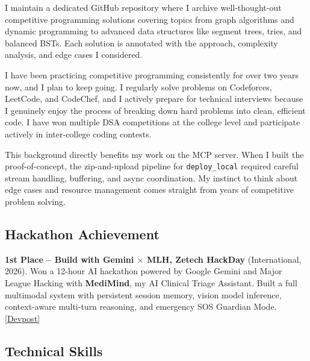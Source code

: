 \documentclass[12pt, a4paper]{article}
\begin{document}
I maintain a dedicated GitHub repository where I archive well-thought-out
competitive programming solutions covering topics from graph algorithms
and dynamic programming to advanced data structures like segment trees,
tries, and balanced BSTs. Each solution is annotated with the approach,
complexity analysis, and edge cases I considered.

I have been practicing competitive programming consistently for over two
years now, and I plan to keep going. I regularly solve problems on
Codeforces, LeetCode, and CodeChef, and I actively prepare for technical
interviews because I genuinely enjoy the process of breaking down hard
problems into clean, efficient code. I have won multiple DSA competitions
at the college level and participate actively in inter-college coding
contests.

This background directly benefits my work on the MCP server. When I
built the proof-of-concept, the zip-and-upload pipeline for
\texttt{deploy\_local} required careful stream handling, buffering, and
async coordination. My instinct to think about edge cases and resource
management comes straight from years of competitive problem solving.

\subsection{Hackathon Achievement}

\begin{achievementbox}
\textbf{1st Place -- Build with Gemini $\times$ MLH, Zetech HackDay}
(International, 2026). Won a 12-hour AI hackathon powered by Google
Gemini and Major League Hacking with \textbf{MediMind}, my AI Clinical
Triage Assistant. Built a full multimodal system with persistent session
memory, vision model inference, context-aware multi-turn reasoning, and
emergency SOS Guardian Mode.
\href{https://devpost.com}{%
  \textcolor{mcblue}{[Devpost]}}
\end{achievementbox}

\subsection{Technical Skills}
\end{document}
